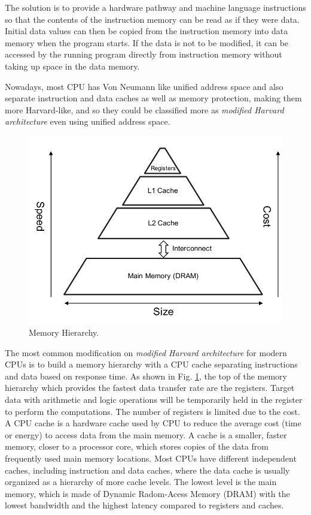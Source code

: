 The solution is to provide a hardware pathway and machine language instructions so that the contents of the instruction memory can be read as if they were data. Initial data values can then be copied from the instruction memory into data memory when the program starts. If the data is not to be modified, it can be accessed by the running program directly from instruction memory without taking up space in the data memory.

Nowadays, most CPU has Von Neumann like unified address space and also separate instruction and data caches as well as memory protection, making them more Harvard-like, and so they could be classified more as \textit{modified Harvard architecture} even using unified address space.

\begin{figure}[htbp]
	\centering
	\includegraphics[width=4.6in]{fig/memory.pdf}
	\caption{Memory Hierarchy.}
	\label{fig:memory-access}
\end{figure}

The most common modification on \textit{modified Harvard architecture}  for modern CPUs is to build a memory hierarchy with a CPU cache separating instructions and data based on response time. As shown in Fig. \ref{fig:memory-access}, the top of the memory hierarchy which provides the fastest data transfer rate are the registers. Target data with arithmetic and logic operations will be temporarily held in the register to perform the computations. The number of registers is limited due to the cost. A CPU cache is a hardware cache used by CPU to reduce the average cost (time or energy) to access data from the main memory. A cache is a smaller, faster memory, closer to a processor core, which stores copies of the data from frequently used main memory locations. Most CPUs have different independent caches, including instruction and data caches, where the data cache is usually organized as a hierarchy of more cache levels. The lowest level is the main memory, which is made of Dynamic Radom-Acess Memory (DRAM) with the lowest bandwidth and the highest latency compared to registers and caches.

